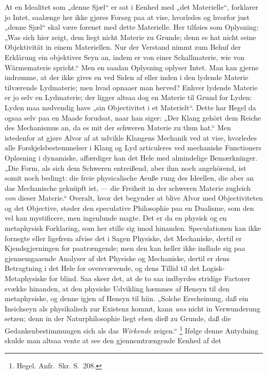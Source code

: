 \documentclass[12pt]{book}
\newcommand{\apage}[1]{\marginnote{\footnotesize\textit{[#1]}}}
\begin{document}
At en Idealitet som „denne Sjæl“ er sat i Eenhed med „det Materielle“, forklarer jo Intet,
saalænge her ikke gjøres Forsøg paa at vise, hvorledes og hvorfor just „denne Sjæl“ skal
være forenet med dette Materielle. Her tilføies som Oplysning: „Was sich hier zeigt, dem
liegt nicht Materie zu Grunde; denn es hat nicht seine Objektivität in einem Materiellen.
Nur der Verstand nimmt zum Behuf der Erklärung ein objektives Seyn an, indem er von einer
Schallmaterie, wie von Wärmematerie spricht.“ Men en saadan Oplysning oplyser Intet. Man kan
gjerne indrømme, at der ikke gives en ved Siden af eller inden i den lydende Materie
tilværende Lydmaterie; men hvad opnaaer man herved? Enhver lydende Materie er jo selv en
Lydmaterie; der ligger altsaa dog en Materie til Grund for Lyden: Lyden maa nødvendig have
„sin Objectivitet i et Materielt“. Dette har Hegel da ogsaa selv paa en Maade forudsat, naar
han siger: „Der Klang gehört dem Reiche des Mechanismus an, da es mit der schweren Materie
zu thun hat.“ Men istedenfor at gjøre Alvor af at udvikle Klangens Mechanik ved at vise,
hvorledes alle Forskjelsbestemmelser i Klang og Lyd articuleres ved mechaniske Functioners
Opløsning i dynamiske, affærdiger han det Hele med almindelige Bemærkninger. „Die Form, als
sich dem Schweren entreißend, aber ihm noch angehörend, ist somit noch bedingt: die freie
physicalische Aeuße\-%
rung \apage{372} des Ideellen, die aber an das Mechanische geknüpft ist, — die Freiheit in der schweren
Materie zugleich \emph{von} dieser Materie.“ Overalt, hvor det begynder at blive Alvor med
Objectiviteten og det Objective, støder den speculative Philosophie paa en Dualisme, som den
vel kan mystificere, men ingenlunde magte. Det er da en physisk og en metaphysisk Forklaring,
som her stille sig imod hinanden. Speculationen kan ikke fornegte eller ligefrem afvise det i
Sagen Physiske, det Mechaniske, dertil er Kjendsgjerningen for paatrængende; men den kan
heller ikke indlade sig paa gjennemgaaende Analyser af det Physiske og Mechaniske, dertil er
dens Betragtning i det Hele for oversvævende, og dens Tillid til det Logisk-Metaphysiske for
blind. Saa skeer det, at de to saa indbyrdes stridige Factorer svække hinanden, at den
physiske Udvikling hæmmes af Hensyn til den metaphysiske, og denne igjen af Hensyn til hiin.
„Solche Erscheinung, daß ein Insichseyn als physikalisch zur Existenz kommt, kann \emph{uns}
nicht in Verwunderung setzen; denn in der Naturphilosophie liegt eben dieß zu Grunde, daß die
Gedankenbestimmungen sich als das \emph{Wirkende} zeigen.“%
\footnote{Hegel. Anfr.\ Skr. S.~208.}
Ifølge denne Antydning skulde man altsaa vente at see den gjennemtrængende Eenhed af det
\end{document}
